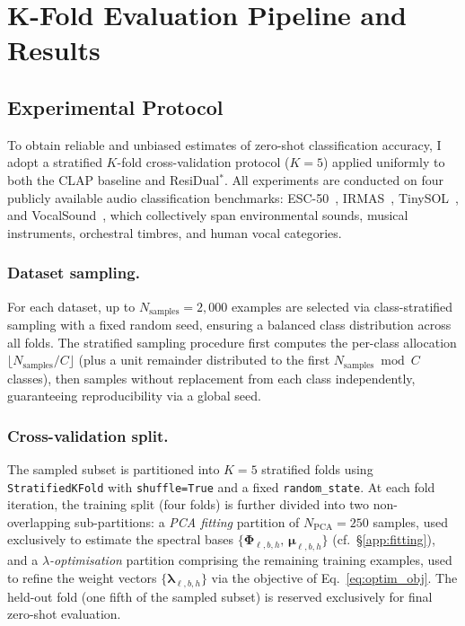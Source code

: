 
\section{K-Fold Evaluation Pipeline and Results}
\label{app:kfold}

\subsection{Experimental Protocol}
\label{app:kfold_protocol}

To obtain reliable and unbiased estimates of zero-shot 
classification accuracy, I adopt a stratified $K$-fold 
cross-validation protocol ($K=5$) applied uniformly to 
both the CLAP baseline and ResiDual$^*$\xspace. 
All experiments are conducted on four publicly 
available audio classification benchmarks: 
ESC-50~\cite{esc50}, IRMAS~\cite{irmas}, 
TinySOL~\cite{tinysol}, and VocalSound~\cite{vocalsound}, 
which collectively span environmental sounds, musical instruments, 
orchestral timbres, and human vocal categories.

\subsubsection{Dataset sampling.}
For each dataset, up to $N_{\mathrm{samples}} = 2{,}000$ 
examples are selected via class-stratified sampling with 
a fixed random seed, ensuring a balanced class distribution 
across all folds. The stratified sampling procedure first 
computes the per-class allocation 
$\lfloor N_{\mathrm{samples}} / C \rfloor$ 
(plus a unit remainder distributed to the first 
$N_{\mathrm{samples}} \bmod C$ classes), then samples 
without replacement from each class independently, 
guaranteeing reproducibility via a global seed.

\subsubsection{Cross-validation split.}
The sampled subset is partitioned into $K=5$ stratified 
folds using \texttt{StratifiedKFold} with \texttt{shuffle=True}
 and a fixed \texttt{random\_state}. At each fold iteration, 
 the training split (four folds) is further divided into 
 two non-overlapping sub-partitions: a \emph{PCA fitting} 
 partition of $N_{\mathrm{PCA}} = 250$ samples, 
 used exclusively to estimate the spectral bases 
 $\{\boldsymbol{\Phi}_{\ell,b,h},\, \boldsymbol{\mu}_{\ell,b,h}\}$ 
 (cf.\ \S\ref{app:fitting}), and a \emph{$\lambda$-optimisation} 
 partition comprising the remaining training examples, 
 used to refine the weight vectors $\{\boldsymbol{\lambda}_{\ell,b,h}\}$ 
 via the objective of Eq.~\eqref{eq:optim_obj}. 
 The held-out fold (one fifth of the sampled subset) 
 is reserved exclusively for final zero-shot evaluation.


